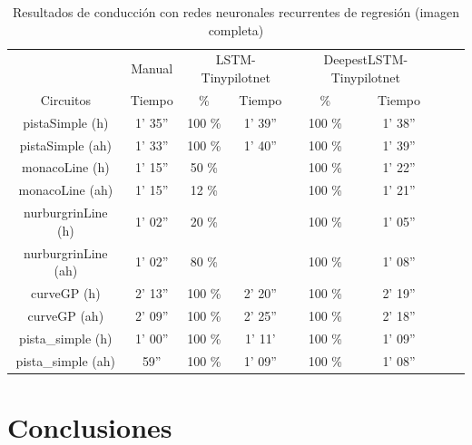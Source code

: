 \begin{table}[H]
\centering
\caption{Resultados de conducción con redes neuronales recurrentes de regresión (imagen completa)}
\label{resultados_regresion_recurrente_completa}
\begin{tabular}{c|c|c|c|c|c|c|c|}
\cline{2-6}
                          & \multicolumn{1}{c|}{Manual} & \multicolumn{2}{c|}{LSTM-Tinypilotnet} & \multicolumn{2}{c|}{DeepestLSTM-Tinypilotnet} \\ \cline{1-6} 
                        \multicolumn{1}{|c|}{Circuitos}    & Tiempo       & \%       & Tiempo       & \%        & Tiempo      \\ \hline
\multicolumn{1}{|c|}{pistaSimple (h)}    & 1' 35''     & 100 \%  & 1' 39''    & 100 \%  & 1' 38''         \\ \hline
\multicolumn{1}{|c|}{pistaSimple (ah)}     & 1' 33''   & 100 \%        & 1' 40''        & 100 \%     & 1' 39''   \\ \hline
\multicolumn{1}{|c|}{monacoLine (h)}      & 1' 15''      & 50 \%        &        & 100 \%       & 1' 22''           \\ \hline
\multicolumn{1}{|c|}{monacoLine (ah)}       & 1' 15''       & 12 \%       &         & 100 \%          & 1' 21''        \\ \hline
\multicolumn{1}{|c|}{nurburgrinLine (h)}      & 1' 02''       & 20 \%     &       & 100 \%     & 1' 05''       \\ \hline
\multicolumn{1}{|c|}{nurburgrinLine (ah)}       & 1' 02''     & 80 \%     &        & 100 \%     & 1' 08''         \\ \hline
\multicolumn{1}{|c|}{curveGP (h)}     & 2' 13''     & 100 \%     & 2' 20''     & 100 \%      & 2' 19''             \\ \hline
\multicolumn{1}{|c|}{curveGP (ah)}       & 2' 09''       & 100 \%    & 2' 25''     & 100 \%       & 2' 18''      \\ \hline
\multicolumn{1}{|c|}{pista\_simple (h)}       & 1' 00''    & 100 \%      & 1' 11'      & 100 \%      & 1' 09''    \\ \hline
\multicolumn{1}{|c|}{pista\_simple (ah)}     & 59''    & 100 \%    & 1' 09''    &  100 \%      & 1' 08''          \\ \hline
\end{tabular}
\end{table}



\section{Conclusiones}

